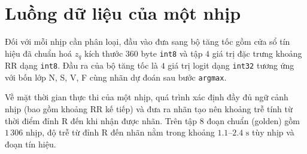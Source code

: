 \section{Luồng dữ liệu của một nhịp}\label{sec:luongdl}

Đối với mỗi nhịp cần phân loại, đầu vào đưa sang bộ tăng tốc gồm cửa sổ tín hiệu đã chuẩn hoá $z_q$ kích thước $360$ byte \texttt{int8} và tập $4$ giá trị đặc trưng khoảng RR dạng \texttt{int8}. Đầu ra của bộ tăng tốc là $4$ giá trị logit dạng \texttt{int32} tương ứng với bốn lớp N, S, V, F cùng nhãn dự đoán sau bước \texttt{argmax}.

Về mặt thời gian thực thi của một nhịp, quá trình xác định đầy đủ ngữ cảnh nhịp (bao gồm khoảng RR kế tiếp) và đưa ra nhãn tạo nên khoảng trễ tính từ thời điểm đỉnh R đến khi nhận được nhãn. Trên tập $8$ đoạn chuẩn (golden) gồm $1\,306$ nhịp, độ trễ từ đỉnh R đến nhãn nằm trong khoảng $1.1\text{--}2.4\text{ s}$ tùy nhịp và đoạn tín hiệu.
